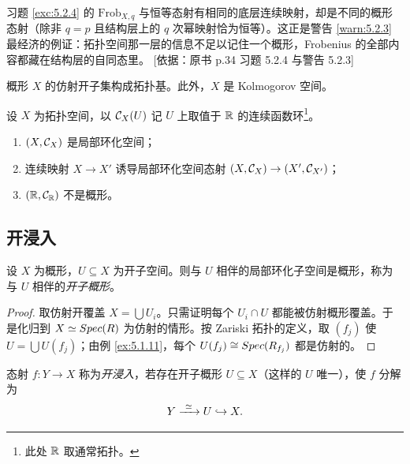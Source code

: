 \begin{yizhu}
习题 \ref{exc:5.2.4} 的 $\mathrm{Frob}_{X,q}$ 与恒等态射有相同的底层连续映射，却是不同的概形态射（除非 $q=p$ 且结构层上的 $q$ 次幂映射恰为恒等）。这正是警告 \ref{warn:5.2.3} 最经济的例证：拓扑空间那一层的信息不足以记住一个概形，Frobenius 的全部内容都藏在结构层的自同态里。
[依据：原书 p.34 习题 5.2.4 与警告 5.2.3]
\end{yizhu}

\begin{lemma}\label{lem:5.2.5}
概形 $X$ 的仿射开子集构成拓扑基。此外，$X$ 是 Kolmogorov 空间。
\end{lemma}

\begin{exercise}\label{exc:5.2.6}
设 $X$ 为拓扑空间，以 $\mathcal{C}_X(U)$ 记 $U$ 上取值于 $\mathbb{R}$ 的连续函数环\footnote{此处 $\mathbb{R}$ 取通常拓扑。}。
\begin{enumerate}[label=(\roman*),leftmargin=2em,itemsep=0.25ex]
  \item $(X,\mathcal{C}_X)$ 是局部环化空间；
  \item 连续映射 $X\to X'$ 诱导局部环化空间态射 $(X,\mathcal{C}_X)\to(X',\mathcal{C}_{X'})$；
  \item $(\mathbb{R},\mathcal{C}_{\mathbb{R}})$ 不是概形。
\end{enumerate}
\end{exercise}

\subsection{开浸入}\label{sec:5.3}

\begin{propdef}\label{prop:5.3.1}
设 $X$ 为概形，$U\subseteq X$ 为开子空间。则与 $U$ 相伴的局部环化子空间是概形，称为与 $U$ 相伴的\emph{开子概形}。
\end{propdef}

\begin{proof}
取仿射开覆盖 $X=\bigcup U_i$。只需证明每个 $U_i\cap U$ 都能被仿射概形覆盖。于是化归到 $X\simeq Spec(R)$ 为仿射的情形。按 Zariski 拓扑的定义，取 $(f_j)$ 使 $U=\bigcup U(f_j)$；由例 \ref{ex:5.1.11}，每个 $U(f_j)\cong Spec(R_{f_j})$ 都是仿射的。
\end{proof}

\begin{definition}\label{def:5.3.2}
态射 $f:Y\to X$ 称为\emph{开浸入}，若存在开子概形 $U\subseteq X$（这样的 $U$ 唯一），使 $f$ 分解为
\[
Y\xrightarrow{\ \simeq\ }U\hookrightarrow X .
\]
\end{definition}

